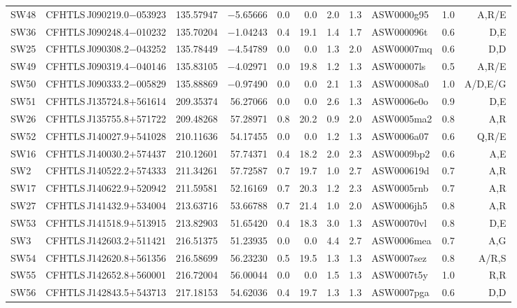 \documentclass[useAMS,usenatbib,a4paper]{mn2e}
\begin{document}
\begin{center}
\begin{longtable}{llrrrrrrlrr}
SW48 & CFHTLS\,J090219.0$-$053923 & 135.57947 &  $-$5.65666 &  0.0 &  0.0 &  2.0 &  1.3 & ASW0000g95 &  1.0 &  A,R/E   \\ 
SW36 & CFHTLS\,J090248.4$-$010232 & 135.70204 &  $-$1.04243 &  0.4 & 19.1 &  1.4 &  1.7 & ASW000096t &  0.6 &  D,E   \\ 
SW25 & CFHTLS\,J090308.2$-$043252 & 135.78449 &  $-$4.54789 &  0.0 &  0.0 &  1.3 &  2.0 & ASW00007mq &  0.6 &  D,D   \\ 
SW49 & CFHTLS\,J090319.4$-$040146 & 135.83105 &  $-$4.02971 &  0.0 & 19.8 &  1.2 &  1.3 & ASW00007ls &  0.5 &  A,R/E   \\ 
SW50 & CFHTLS\,J090333.2$-$005829 & 135.88869 &  $-$0.97490 &  0.0 &  0.0 &  2.1 &  1.3 & ASW00008a0 &  1.0 &  A/D,E/G   \\ 
SW51 & CFHTLS\,J135724.8$+$561614 & 209.35374 &    56.27066 &  0.0 &  0.0 &  2.6 &  1.3 & ASW0006e0o &  0.9 &  D,E   \\ 
SW26 & CFHTLS\,J135755.8$+$571722 & 209.48268 &    57.28971 &  0.8 & 20.2 &  0.9 &  2.0 & ASW0005ma2 &  0.8 &  A,R   \\ 
SW52 & CFHTLS\,J140027.9$+$541028 & 210.11636 &    54.17455 &  0.0 &  0.0 &  1.2 &  1.3 & ASW0006a07 &  0.6 &  Q,R/E   \\ 
SW16 & CFHTLS\,J140030.2$+$574437 & 210.12601 &    57.74371 &  0.4 & 18.2 &  2.0 &  2.3 & ASW0009bp2 &  0.6 &  A,E   \\ 
SW2  & CFHTLS\,J140522.2$+$574333 & 211.34261 &    57.72587 &  0.7 & 19.7 &  1.0 &  2.7 & ASW000619d &  0.7 &  A,R   \\ 
SW17 & CFHTLS\,J140622.9$+$520942 & 211.59581 &    52.16169 &  0.7 & 20.3 &  1.2 &  2.3 & ASW0005rnb &  0.7 &  A,R   \\ 
SW27 & CFHTLS\,J141432.9$+$534004 & 213.63716 &    53.66788 &  0.7 & 21.4 &  1.0 &  2.0 & ASW0006jh5 &  0.8 &  A,R   \\ 
SW53 & CFHTLS\,J141518.9$+$513915 & 213.82903 &    51.65420 &  0.4 & 18.3 &  3.0 &  1.3 & ASW00070vl &  0.8 &  D,E   \\ 
SW3  & CFHTLS\,J142603.2$+$511421 & 216.51375 &    51.23935 &  0.0 &  0.0 &  4.4 &  2.7 & ASW0006mea &  0.7 &  A,G   \\ 
SW54 & CFHTLS\,J142620.8$+$561356 & 216.58699 &    56.23230 &  0.5 & 19.5 &  1.3 &  1.3 & ASW0007sez &  0.8 &  A/R,S   \\ 
SW55 & CFHTLS\,J142652.8$+$560001 & 216.72004 &    56.00044 &  0.0 &  0.0 &  1.5 &  1.3 & ASW0007t5y &  1.0 &  R,R   \\ 
SW56 & CFHTLS\,J142843.5$+$543713 & 217.18153 &    54.62036 &  0.4 & 19.7 &  1.3 &  1.3 & ASW0007pga &  0.6 &  D,D   \\ 

\end{longtable}
\end{center}
\end{document}
